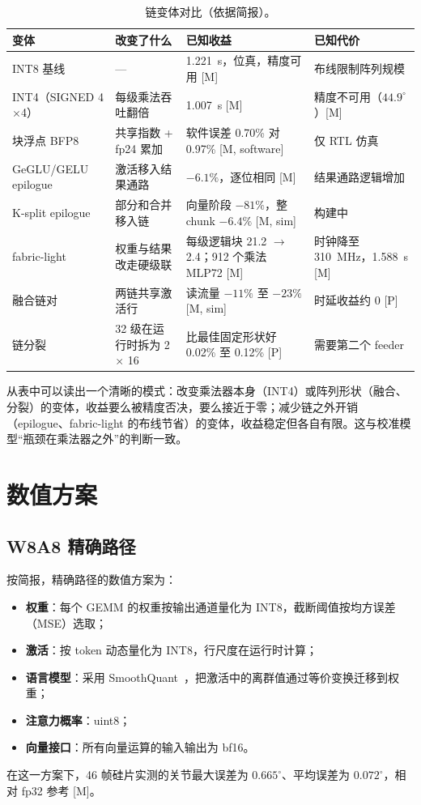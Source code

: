 \documentclass[a4paper,10.5pt]{ctexart}
\newcommand{\tM}{\textsf{[M]}}              %
\newcommand{\tP}{\textsf{[P]}}              %
\newcommand{\tMsim}{\textsf{[M, sim]}}      %
\newcommand{\tMsw}{\textsf{[M, software]}}  %
\begin{document}
\begin{table}[h]
\centering
\caption{链变体对比（依据简报）。}
\label{tab:variants}
\small
\begin{tabularx}{\textwidth}{l Y Y Y}
\toprule
变体 & 改变了什么 & 已知收益 & 已知代价 \\
\midrule
INT8 基线 & — & 1.221~s，位真，精度可用 \tM & 布线限制阵列规模 \\
INT4（SIGNED 4$\times$4） & 每级乘法吞吐翻倍 & 1.007~s \tM & 精度不可用（$44.9^\circ$）\tM \\
块浮点 BFP8 & 共享指数 + fp24 累加 & 软件误差 0.70\% 对 0.97\% \tMsw & 仅 RTL 仿真 \\
GeGLU/GELU epilogue & 激活移入结果通路 & $-6.1\%$，逐位相同 \tM & 结果通路逻辑增加 \\
K-split epilogue & 部分和合并移入链 & 向量阶段 $-81\%$，整 chunk $-6.4\%$ \tMsim & 构建中 \\
fabric-light & 权重与结果改走硬级联 & 每级逻辑块 21.2 $\to$ 2.4；912 个乘法 MLP72 \tM & 时钟降至 310~MHz，1.588~s \tM \\
融合链对 & 两链共享激活行 & 读流量 $-11\%$ 至 $-23\%$ \tMsim & 时延收益约 0 \tP \\
链分裂 & 32 级在运行时拆为 2 $\times$ 16 & 比最佳固定形状好 0.02\% 至 0.12\% \tP & 需要第二个 feeder \\
\bottomrule
\end{tabularx}
\end{table}

从表中可以读出一个清晰的模式：改变乘法器本身（INT4）或阵列形状（融合、分裂）的变体，收益要么被精度否决，要么接近于零；减少链之外开销（epilogue、fabric-light 的布线节省）的变体，收益稳定但各自有限。这与校准模型“瓶颈在乘法器之外”的判断一致。


\section{数值方案}\label{sec:numerics}

\subsection{W8A8 精确路径}

按简报，精确路径的数值方案为：
\begin{itemize}
  \item \textbf{权重}：每个 GEMM 的权重按输出通道量化为 INT8，截断阈值按均方误差（MSE）选取；
  \item \textbf{激活}：按 token 动态量化为 INT8，行尺度在运行时计算；
  \item \textbf{语言模型}：采用 SmoothQuant~\cite{smoothquant}，把激活中的离群值通过等价变换迁移到权重；
  \item \textbf{注意力概率}：uint8；
  \item \textbf{向量接口}：所有向量运算的输入输出为 bf16。
\end{itemize}
在这一方案下，46 帧硅片实测的关节最大误差为 $0.665^\circ$、平均误差为 $0.072^\circ$，相对 fp32 参考 \tM。
\end{document}
